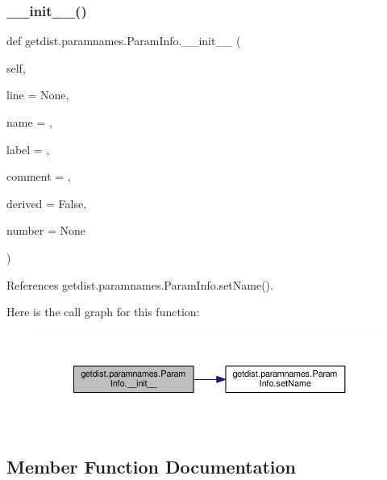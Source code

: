 \subsubsection{\texorpdfstring{\+\_\+\+\_\+init\+\_\+\+\_\+()}{\_\_init\_\_()}}
{\footnotesize\ttfamily def getdist.\+paramnames.\+Param\+Info.\+\_\+\+\_\+init\+\_\+\+\_\+ (\begin{DoxyParamCaption}\item[{}]{self,  }\item[{}]{line = {\ttfamily None},  }\item[{}]{name = {\ttfamily \textquotesingle{}\textquotesingle{}},  }\item[{}]{label = {\ttfamily \textquotesingle{}\textquotesingle{}},  }\item[{}]{comment = {\ttfamily \textquotesingle{}\textquotesingle{}},  }\item[{}]{derived = {\ttfamily False},  }\item[{}]{number = {\ttfamily None} }\end{DoxyParamCaption})}



References getdist.\+paramnames.\+Param\+Info.\+set\+Name().

Here is the call graph for this function\+:
\nopagebreak
\begin{figure}[H]
\begin{center}
\leavevmode
\includegraphics[width=350pt]{classgetdist_1_1paramnames_1_1ParamInfo_ac84b3807f29c2c25430ff7cd31ac298c_cgraph}
\end{center}
\end{figure}


\subsection{Member Function Documentation}
\mbox{\label{classgetdist_1_1paramnames_1_1ParamInfo_a15bd2f5866334a64ac62a19db186ee7a}} 
